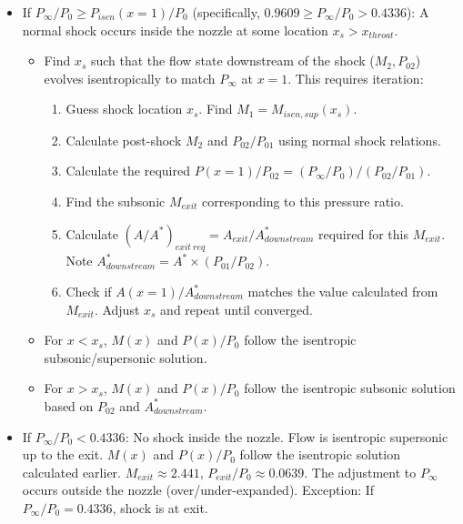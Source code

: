 \begin{itemize}
\begin{itemize}
    \begin{itemize}
    \tightlist
    \item
      If \(P_{\infty}/P_0 \ge P_{isen}(x=1)/P_0\) (specifically,
      \(0.9609 \ge P_{\infty}/P_0 > 0.4336\)): A normal shock occurs
      inside the nozzle at some location \(x_s > x_{throat}\).

      \begin{itemize}
      \tightlist
      \item
        Find \(x_s\) such that the flow state downstream of the shock
        (\(M_2, P_{02}\)) evolves isentropically to match \(P_{\infty}\)
        at \(x=1\). This requires iteration:

        \begin{enumerate}
        \def\labelenumi{\arabic{enumi}.}
        \tightlist
        \item
          Guess shock location \(x_s\). Find
          \(M_1 = M_{isen, sup}(x_s)\).
        \item
          Calculate post-shock \(M_2\) and \(P_{02}/P_{01}\) using
          normal shock relations.
        \item
          Calculate the required
          \(P(x=1)/P_{02} = (P_{\infty}/P_0) / (P_{02}/P_{01})\).
        \item
          Find the subsonic \(M_{exit}\) corresponding to this pressure
          ratio.
        \item
          Calculate
          \((A/A^*)_{exit\ req} = A_{exit} / A^*_{downstream}\) required
          for this \(M_{exit}\). Note
          \(A^*_{downstream} = A^* \times (P_{01}/P_{02})\).
        \item
          Check if \(A(x=1) / A^*_{downstream}\) matches the value
          calculated from \(M_{exit}\). Adjust \(x_s\) and repeat until
          converged.
        \end{enumerate}
      \item
        For \(x < x_s\), \(M(x)\) and \(P(x)/P_0\) follow the isentropic
        subsonic/supersonic solution.
      \item
        For \(x > x_s\), \(M(x)\) and \(P(x)/P_0\) follow the isentropic
        subsonic solution based on \(P_{02}\) and \(A^*_{downstream}\).
      \end{itemize}
    \item
      If \(P_{\infty}/P_0 < 0.4336\): No shock inside the nozzle. Flow
      is isentropic supersonic up to the exit. \(M(x)\) and \(P(x)/P_0\)
      follow the isentropic solution calculated earlier.
      \(M_{exit} \approx 2.441\), \(P_{exit}/P_0 \approx 0.0639\). The
      adjustment to \(P_{\infty}\) occurs outside the nozzle
      (over/under-expanded). Exception: If \(P_{\infty}/P_0 = 0.4336\),
      shock is at exit.
    \end{itemize}
  \end{itemize}
\end{itemize}

